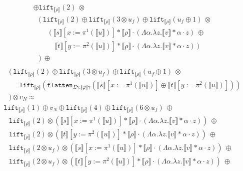 \documentclass[a4paper,UKenglish,cleveref,autoref,numberwithinsect]{lipics-v2019}
\theoremstyle{definition}
\newcommand{\abs}[2]{\lambda #1.#2}
\newcommand{\tabs}[2]{\Lambda #1.#2}
\newcommand{\flatten}{\mathtt{flatten}}
\newcommand{\lift}{\mathtt{lift}}
\newcommand{\typeinterpret}[1]{\llbracket #1 \rrbracket}
\newcommand{\interpret}[1]{\llbracket #1 \rrbracket}
\begin{document}
\begin{itemize}
\[\begin{array}{l}
    \oplus \lift_{\interpret{\rho}}(2)\ \otimes \\
  \phantom{A}
  (\ \lift_{\typeinterpret{\rho}}(2) \oplus
    \lift_{\typeinterpret{\rho}}(3 \otimes u_f) \oplus
     \lift_{\typeinterpret{\rho}}(u_f \oplus 1)\ \otimes \\
  \phantom{ABC}(\ \interpret{s}[x:=\pi^1(\interpret{u})] *
    \typeinterpret{\rho} \cdot
    (\tabs{\alpha}{\abs{z}{\interpret{v} * \alpha \cdot z}})\ \oplus \\
  \phantom{ABCD} \interpret{t}[y:=\pi^2(\interpret{u})] *
    \typeinterpret{\rho} \cdot
    (\tabs{\alpha}{\abs{z}{\interpret{v} * \alpha \cdot z}})\ ) \\
  \phantom{A})\ \oplus \\
  \end{array}\]\[\begin{array}{l}
  \phantom{A}(\
  \lift_{\typeinterpret{\rho}}(2) \oplus
    \lift_{\typeinterpret{\rho}}(3 \otimes u_f) \oplus
  \lift_{\typeinterpret{\rho}}(u_f \oplus 1)\ \otimes \\
  \phantom{ABC}
    \lift_{\typeinterpret{\rho}}(\flatten_{\Sigma\gamma.\typeinterpret{
    \varphi}\gamma}(\interpret{s}[x:=\pi^1(\interpret{u})] \oplus
      \interpret{t}[y:=\pi^2(\interpret{u})])) \\
  \phantom{A}) \otimes v_N \approx \\
  \lift_{\interpret{\rho}}(1) \oplus v_N \oplus
    \lift_{\interpret{\rho}}(4) \oplus
    \lift_{\typeinterpret{\rho}}(6 \otimes u_f)\ \oplus \\
  \phantom{A}
  \lift_{\interpret{\rho}}(2) \otimes
      (\interpret{s}[x:=\pi^1(\interpret{u})] * \typeinterpret{\rho} \cdot
      (\tabs{\alpha}{\abs{z}{\interpret{v} * \alpha \cdot z}}))\ \oplus \\
  \phantom{A}
  \lift_{\interpret{\rho}}(2) \otimes
      (\interpret{t}[y:=\pi^2(\interpret{u})] * \typeinterpret{\rho} \cdot
      (\tabs{\alpha}{\abs{z}{\interpret{v} * \alpha \cdot z}}))\ \oplus \\
  \phantom{A}
  \lift_{\interpret{\rho}}(2 \otimes u_f) \otimes
    (\interpret{s}[x:=\pi^1(\interpret{u})] *
    \typeinterpret{\rho} \cdot
    (\tabs{\alpha}{\abs{z}{\interpret{v} * \alpha \cdot z}}))\ \oplus \\
  \phantom{A}
  \lift_{\interpret{\rho}}(2 \otimes u_f) \otimes
    (\interpret{t}[y:=\pi^2(\interpret{u})] *
    \typeinterpret{\rho} \cdot
    (\tabs{\alpha}{\abs{z}{\interpret{v} * \alpha \cdot z}}))\ \oplus \\
  \phantom{A}

\end{array}\]
\end{itemize}
\end{document}
